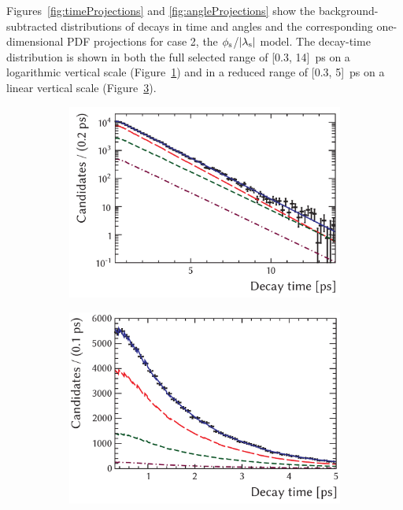 Figures~\ref{fig:timeProjections} and \ref{fig:angleProjections} show the background-subtracted distributions of decays in time and angles
and the corresponding one-dimensional PDF projections for case 2, the $\phi_\text{s}$/$|{\lambda_{\text{s}}}|$ model. The decay-time distribution is shown in
both the full selected range of [0.3, 14]~ps on a logarithmic vertical scale (Figure~\ref{fig:timeProjections_log}) and in a reduced range
of [0.3, 5]~ps on a linear vertical scale (Figure~\ref{fig:timeProjections_lin}).
\begin{figure}[htb]
  \centering
  \begin{subfigure}{0.49\textwidth}
    \includegraphics[width=\textwidth]{graphics/results/timeLog}
    \caption{}
    \label{fig:timeProjections_log}
  \end{subfigure}
  \hfill%
  \begin{subfigure}{0.49\textwidth}
    \includegraphics[width=\textwidth]{graphics/results/timeLin}
    \caption{}
    \label{fig:timeProjections_lin}
  \end{subfigure}


\end{figure}

